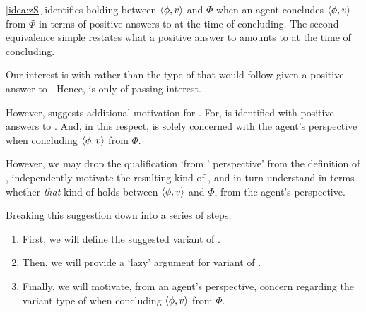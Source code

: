 \begin{note}
  \autoref{idea:zS} identifies \zS{} holding between \(\langle \phi, v \rangle\) and \(\Phi\) when an agent concludes \(\langle \phi, v \rangle\) from \(\Phi\) in terms of positive answers to \qzS{} at the time of concluding.
  The second equivalence simple restates what a positive answer to \qzS{} amounts to at the time of concluding.

  Our interest is with \qzS{} rather than the type of \support{} that would follow given a positive answer to \qzS{}.
  Hence, \zS{} is only of passing interest.

  However, \zS{} suggests additional motivation for \qzS{}.
  For, \zS{} is identified with positive answers to \qzS{}.
  And, in this respect, \zS{} is solely concerned with the agent's perspective when concluding \(\langle \phi, v \rangle\) from \(\Phi\).

  However, we may drop the qualification `from \vAgent{}' perspective' from the definition of \zS{}, independently motivate the resulting kind of \support{}, and in turn understand \qzS{} in terms whether \emph{that} kind of \support{} holds between \(\langle \phi, v \rangle\) and \(\Phi\), from the agent's perspective.

  Breaking this suggestion down into a series of steps:
  \begin{enumerate}[label=, noitemsep]
  \item
    First, we will define the suggested variant of \zS{}.
  \item
    Then, we will provide a `lazy' argument for variant of \zS{}.
  \item
    Finally, we will motivate, from an agent's perspective, concern regarding the variant type of \support{} when concluding \(\langle \phi, v \rangle\) from \(\Phi\).
  \end{enumerate}
\end{note}

\subsubsection{\zSX{}}

